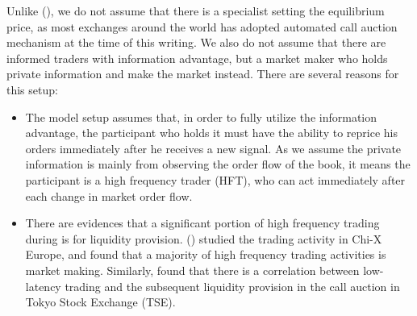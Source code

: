 \documentclass{article}
\begin{document}
Unlike (\cite{Madhavan2015}), we do not assume that there is a specialist setting the equilibrium price, as most exchanges around the world has adopted automated call auction mechanism at the time of this writing. We also do not assume that there are informed traders with information advantage, but a market maker who holds private information and make the market instead. There are several reasons for this setup:
\begin{itemize}
  \item The model setup assumes that, in order to fully utilize the information advantage, the participant who holds it must have the ability to reprice his orders immediately after he receives a new signal. As we assume the private information is mainly from observing the order flow of the book, it means the participant is a high frequency trader (HFT), who can act immediately after each change in market order flow.
  \item There are evidences that a significant portion of high frequency trading during is for liquidity provision. (\cite{Menkveld2013}) studied the trading activity in Chi-X Europe, and found that a majority of high frequency trading activities is market making. Similarly, \cite{Bellia2017} found that there is a correlation between low-latency trading and the subsequent liquidity provision in the call auction in Tokyo Stock Exchange (TSE).
\end{itemize}
\end{document}

